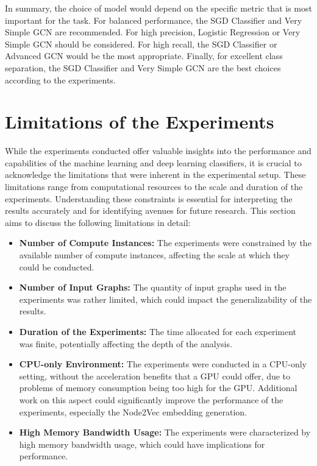 In summary, the choice of model would depend on the specific metric that is most important for the task. For balanced performance, the SGD Classifier and Very Simple GCN are recommended. For high precision, Logistic Regression or Very Simple GCN should be considered. For high recall, the SGD Classifier or Advanced GCN would be the most appropriate. Finally, for excellent class separation, the SGD Classifier and Very Simple GCN are the best choices according to the experiments.

\section{Limitations of the Experiments}

While the experiments conducted offer valuable insights into the performance and capabilities of the machine learning and deep learning classifiers, it is crucial to acknowledge the limitations that were inherent in the experimental setup. These limitations range from computational resources to the scale and duration of the experiments. Understanding these constraints is essential for interpreting the results accurately and for identifying avenues for future research. This section aims to discuss the following limitations in detail:

\begin{itemize}
    \item \textbf{Number of Compute Instances:} The experiments were constrained by the available number of compute instances, affecting the scale at which they could be conducted.
    
    \item \textbf{Number of Input Graphs:} The quantity of input graphs used in the experiments was rather limited, which could impact the generalizability of the results.
    
    \item \textbf{Duration of the Experiments:} The time allocated for each experiment was finite, potentially affecting the depth of the analysis.
    
    \item \textbf{CPU-only Environment:} The experiments were conducted in a CPU-only setting, without the acceleration benefits that a GPU could offer, due to problems of memory consumption being too high for the GPU. Additional work on this aspect could significantly improve the performance of the experiments, especially the Node2Vec embedding generation.
    
    \item \textbf{High Memory Bandwidth Usage:} The experiments were characterized by high memory bandwidth usage, which could have implications for performance.
\end{itemize}

